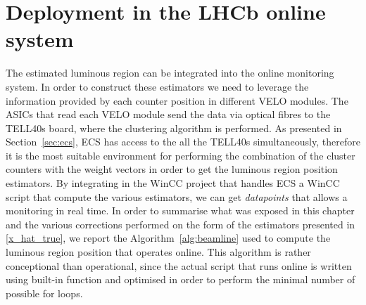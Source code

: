 \section{Deployment in the LHCb online system}\label{sec:beamline_integration}
The estimated luminous region can be integrated into the online monitoring system. In order to construct these estimators we need to leverage the information provided by each counter position in different VELO modules. The ASICs that read each VELO module send the data via optical fibres to the TELL40s board, where the clustering algorithm is performed. As presented in Section~\ref{sec:ecs}, ECS has access to the all the TELL40s simultaneously, therefore it is the most suitable environment for performing the combination of the cluster counters with the weight vectors in order to get the luminous region position estimators. By integrating in the WinCC project that handles ECS a WinCC script that compute the various estimators, we can get \textit{datapoints} that allows a monitoring in real time.
In order to summarise what was exposed in this chapter and the various corrections performed on the form of the estimators presented in \eqref{x_hat_true}, we report the Algorithm~\ref{alg:beamline} used to compute the luminous region position that operates online. This algorithm is rather conceptional than operational, since the actual script that runs online is written using built-in function and optimised in order to perform the minimal number of possible for loops. %

